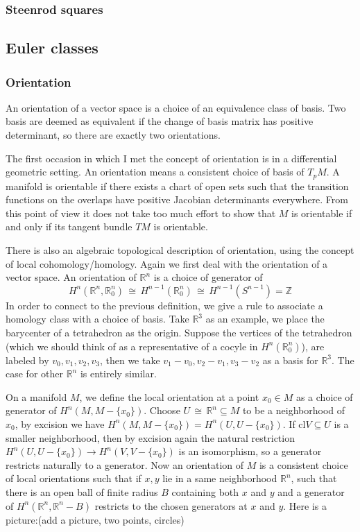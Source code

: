 \documentclass[12pt]{article}
\theoremstyle{plain}
\theoremstyle{definition}
\newcommand{\IR}{\mathbb{R}}
\newcommand{\IZ}{\mathbb{Z}}
\newcommand\iso{\,{\cong}\,}
\newcommand{\<}{\langle}
\renewcommand{\>}{\rangle}
\newcommand{\cl}{\mathrm{cl}}
\begin{document}
\subsubsection{Steenrod squares}

\subsection{Euler classes}
\subsubsection{Orientation}
An orientation of a vector space is a choice of an equivalence class of basis. Two basis are deemed as equivalent if the change of basis matrix has positive determinant, so there are exactly two orientations. 

The first occasion in which I met the concept of orientation is in a differential geometric setting. An orientation means a consistent choice of basis of $T_p M$. A manifold is orientable if there exists a chart of open sets such that the transition functions on the overlaps have positive Jacobian determinants everywhere. From this point of view it does not take too much effort to show that $M$ is orientable if and only if its tangent bundle $TM$ is orientable. 

There is also an algebraic topological description of orientation, using the concept of local cohomology/homology. Again we first deal with the orientation of a vector space. An orientation of $\IR^n$ is a choice of generator of $$H^n(\IR^n, \IR^n_0) \iso H^{n-1}(\IR^n_0) \iso H^{n - 1}(S^{n - 1}) = \IZ$$
In order to connect to the previous definition, we give a rule to associate a homology class with a choice of basis. Take $\IR^3$ as an example, we place the barycenter of a tetrahedron as the origin. Suppose the vertices of the tetrahedron (which we should think of as a representative of a cocyle in $H^n(\IR^n_0)$), are labeled by $v_0, v_1, v_2, v_3$, then we take $v_1 - v_0, v_2 - v_1, v_3 - v_2$ as a basis for $\IR^3$. The case for other $\IR^n$ is entirely similar. 

On a manifold $M$, we define the local orientation at a point $x_0 \in M$ as a choice of generator of $H^n(M, M-\{x_0\})$. Choose $U \iso \IR^n \subseteq M$ to be a neighborhood of $x_0$, by excision we have $H^n(M, M-\{x_0\}) = H^n(U, U-\{x_0\})$. If $\cl{V} \subseteq U$ is a smaller neighborhood, then by excision again the natural restriction $H^n(U, U-\{x_0\}) \to H^n(V, V-\{x_0\})$ is an isomorphism, so a generator restricts naturally to a generator. Now an orientation of $M$ is a consistent choice of local orientations such that if $x, y$ lie in a same neighborhood $\IR^n$, such that there is an open ball of finite radius $B$ containing both $x$ and $y$ and a generator of $H^n(\IR^n, \IR^n - B)$ restricts to the chosen generators at $x$ and $y$. Here is a picture:(add a picture, two points, circles)
\end{document}
